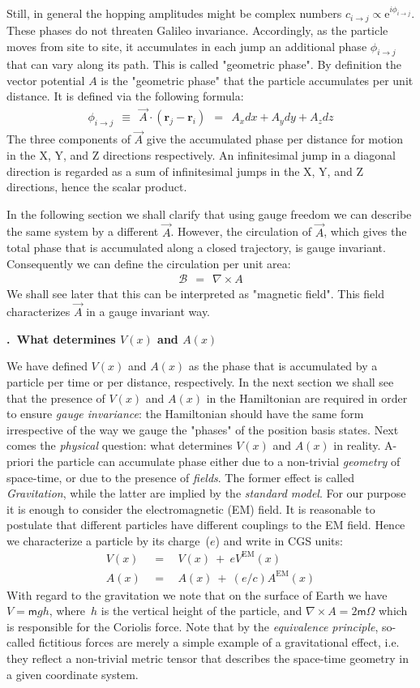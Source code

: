 \documentclass[onecolumn,fleqn, 11pt]{revtex4}
\newcommand{\eexp}{\mathrm{e}^}
\newcommand{\mass}{\mathsf{m}}
\newcommand{\tbox}[1]{\text{#1}}
\newcommand{\beq}{\begin{eqnarray}}
\newcommand{\eeq}{\end{eqnarray}}
\renewcommand{\thesubsection}{\arabic{subsection}}
\renewcommand{\thesubsubsection}{\arabic{subsubsection}}
\newcommand{\sheadC}[1]
{
\addtocounter{subsubsection}{1}
\vspace{5mm}
{\bf \thesubsection.\thesubsubsection \ #1}  
\nopagebreak
\phantomsection
}
\begin{document}
Still, in general the hopping amplitudes 
might be complex numbers ${c_{i \rightarrow j} \propto \eexp{i \phi_{i \rightarrow j} }}$.
These phases do not threaten Galileo invariance.
Accordingly, as the particle moves from site to site, 
it accumulates in each jump an additional phase $\phi_{i \rightarrow j}$ 
that can vary along its path. This is called "geometric phase".
By definition the vector potential $A$ is the "geometric phase" 
that the particle accumulates per unit distance. 
It is defined via the following formula:
\beq 
\phi_{i \rightarrow j} \ \ \equiv \ \ \vec{A}\cdot (\mathbf{r}_j-\mathbf{r}_i) 
\ \ = \ \ A_x dx + A_y dy + A_z dz
\eeq
The three components of $\vec{A}$ give the accumulated phase per distance 
for motion in the X, Y, and Z directions respectively.
An infinitesimal jump in a diagonal direction is regarded as a sum 
of infinitesimal jumps in the X, Y, and Z directions, hence the scalar product. 
 

In the following section we shall clarify that using gauge freedom 
we can describe the same system by a different $\vec{A}$. 
However, the circulation of $\vec{A}$, which gives the total phase 
that is accumulated along a closed trajectory, is gauge invariant. 
Consequently we can define the circulation per unit area:
\beq 
\mathcal{B} \ \ = \ \ \nabla \times A
\eeq
We shall see later that this can be interpreted as "magnetic field".
This field characterizes $\vec{A}$ in a gauge invariant way.



\sheadC{What determines $V(x)$ and $A(x)$}

We have defined $V(x)$ and $A(x)$ as the phase that is accumulated 
by a particle per time or per distance, respectively. In the next section 
we shall see that the presence of $V(x)$ and $A(x)$ in the Hamiltonian 
are required in order to ensure {\em gauge invariance}: the Hamiltonian 
should have the same form irrespective of the way we gauge the "phases" 
of the position basis states. Next comes the {\em physical} question: 
what determines $V(x)$ and $A(x)$ in reality. A-priori the particle 
can accumulate phase either due to a non-trivial {\em geometry} of 
space-time, or due to the presence of {\em fields}. The former effect is 
called {\em Gravitation}, while the latter are implied by the {\em standard model}. 
For our purpose it is enough to consider the electromagnetic (EM) field.
It is reasonable to postulate that different particles have different 
couplings to the EM field. Hence we characterize a particle by its charge~($e$)
and write in CGS units:
\beq 
V(x) \ \ &=& \ \  V(x) \ + \ eV^{\tbox{EM}}(x) \\
A(x) \ \ &=& \ \  A(x) \ + \ (e/c)A^{\tbox{EM}}(x)
\eeq
With regard to the gravitation we note that on the surface of Earth  
we have ${V=\mass gh}$, where~$h$ is the vertical height of the particle, 
and ${\nabla \times A = 2\mass\Omega}$ which is responsible for the Coriolis force.   
Note that by the {\em equivalence principle}, so-called fictitious 
forces are merely a simple example of a gravitational effect, 
i.e. they reflect a non-trivial metric tensor that describes 
the space-time geometry in a given coordinate system.
\end{document}
